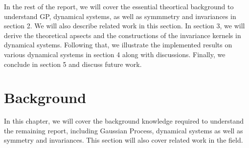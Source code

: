 \documentclass{statsmsc}
\begin{document}
In the rest of the report, we will cover the essential theortical background to understand GP, dynamical systems, as well as symmmetry and invariances in section 2. We will also describe related work in this section.
In section 3, we will derive the theoretical apsects and the constructions of the invariance kernels in dynamical systems.
Following that, we illustrate the implemented results on various dynamical systems in section 4 along with discussions.
Finally, we conclude in section 5 and discuss future work.

 
\chapter{Background}
In this chapter, we will cover the background knowledge required to understand the remaining report, including Gaussian Process, dynamical systems as well as symmetry and invariances. 
This section will also cover related work in the field.
\end{document}
